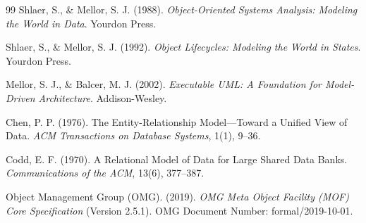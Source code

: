 \documentclass[11pt,a4paper]{ltjsarticle}
\theoremstyle{definition}
\theoremstyle{plain}
\theoremstyle{remark}
\begin{document}
\begin{thebibliography}{99}
Shlaer, S., \& Mellor, S. J. (1988).
\emph{Object-Oriented Systems Analysis: Modeling the World in Data}.
Yourdon Press.

Shlaer, S., \& Mellor, S. J. (1992).
\emph{Object Lifecycles: Modeling the World in States}.
Yourdon Press.

Mellor, S. J., \& Balcer, M. J. (2002).
\emph{Executable UML: A Foundation for Model-Driven Architecture}.
Addison-Wesley.

Chen, P. P. (1976).
The Entity-Relationship Model---Toward a Unified View of Data.
\emph{ACM Transactions on Database Systems}, 1(1), 9--36.

Codd, E. F. (1970).
A Relational Model of Data for Large Shared Data Banks.
\emph{Communications of the ACM}, 13(6), 377--387.

Object Management Group (OMG). (2019).
\emph{OMG Meta Object Facility (MOF) Core Specification} (Version 2.5.1).
OMG Document Number: formal/2019-10-01.

\end{thebibliography}
\end{document}
